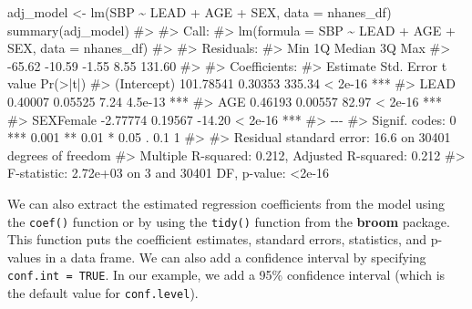 \documentclass[
  letterpaper,
]{latex/krantz}
\makeatletter
\newenvironment{Shaded}{\begin{snugshade}}{\end{snugshade}}
\newcommand{\AttributeTok}[1]{\textcolor[rgb]{0.40,0.45,0.13}{#1}}
\newcommand{\CommentTok}[1]{\textcolor[rgb]{0.37,0.37,0.37}{#1}}
\newcommand{\FunctionTok}[1]{\textcolor[rgb]{0.28,0.35,0.67}{#1}}
\newcommand{\NormalTok}[1]{\textcolor[rgb]{0.00,0.23,0.31}{#1}}
\newcommand{\OtherTok}[1]{\textcolor[rgb]{0.00,0.23,0.31}{#1}}
\newcommand{\SpecialCharTok}[1]{\textcolor[rgb]{0.37,0.37,0.37}{#1}}
\newenvironment{kframe}{%
\medskip{}
\setlength{\fboxsep}{.8em}
 \def\at@end@of@kframe{}%
 \ifinner\ifhmode%
  \def\at@end@of@kframe{\end{minipage}}%
  \begin{minipage}{\columnwidth}%
 \fi\fi%
 \def\FrameCommand##1{\hskip\@totalleftmargin \hskip-\fboxsep
 \colorbox{shadecolor}{##1}\hskip-\fboxsep
     \hskip-\linewidth \hskip-\@totalleftmargin \hskip\columnwidth}%
 \MakeFramed {\advance\hsize-\width
   \@totalleftmargin\z@ \linewidth\hsize
   \@setminipage}}%
 {\par\unskip\endMakeFramed%
 \at@end@of@kframe}
\renewenvironment{Shaded}{\begin{kframe}}{\end{kframe}}
\makeatother
\begin{document}
\begin{Shaded}
\begin{Highlighting}[]
\NormalTok{adj\_model }\OtherTok{\textless{}{-}} \FunctionTok{lm}\NormalTok{(SBP }\SpecialCharTok{\textasciitilde{}}\NormalTok{ LEAD }\SpecialCharTok{+}\NormalTok{ AGE }\SpecialCharTok{+}\NormalTok{ SEX, }\AttributeTok{data =}\NormalTok{ nhanes\_df)}
\FunctionTok{summary}\NormalTok{(adj\_model)}
\CommentTok{\#\textgreater{} }
\CommentTok{\#\textgreater{} Call:}
\CommentTok{\#\textgreater{} lm(formula = SBP \textasciitilde{} LEAD + AGE + SEX, data = nhanes\_df)}
\CommentTok{\#\textgreater{} }
\CommentTok{\#\textgreater{} Residuals:}
\CommentTok{\#\textgreater{}    Min     1Q Median     3Q    Max }
\CommentTok{\#\textgreater{} {-}65.62 {-}10.59  {-}1.55   8.55 131.60 }
\CommentTok{\#\textgreater{} }
\CommentTok{\#\textgreater{} Coefficients:}
\CommentTok{\#\textgreater{}              Estimate Std. Error t value Pr(\textgreater{}|t|)    }
\CommentTok{\#\textgreater{} (Intercept) 101.78541    0.30353  335.34  \textless{} 2e{-}16 ***}
\CommentTok{\#\textgreater{} LEAD          0.40007    0.05525    7.24  4.5e{-}13 ***}
\CommentTok{\#\textgreater{} AGE           0.46193    0.00557   82.97  \textless{} 2e{-}16 ***}
\CommentTok{\#\textgreater{} SEXFemale    {-}2.77774    0.19567  {-}14.20  \textless{} 2e{-}16 ***}
\CommentTok{\#\textgreater{} {-}{-}{-}}
\CommentTok{\#\textgreater{} Signif. codes:  0 \textquotesingle{}***\textquotesingle{} 0.001 \textquotesingle{}**\textquotesingle{} 0.01 \textquotesingle{}*\textquotesingle{} 0.05 \textquotesingle{}.\textquotesingle{} 0.1 \textquotesingle{} \textquotesingle{} 1}
\CommentTok{\#\textgreater{} }
\CommentTok{\#\textgreater{} Residual standard error: 16.6 on 30401 degrees of freedom}
\CommentTok{\#\textgreater{} Multiple R{-}squared:  0.212,  Adjusted R{-}squared:  0.212 }
\CommentTok{\#\textgreater{} F{-}statistic: 2.72e+03 on 3 and 30401 DF,  p{-}value: \textless{}2e{-}16}
\end{Highlighting}
\end{Shaded}

We can also extract the estimated regression coefficients from the model
using the \texttt{coef()}
function or by using the
\texttt{tidy()} function from
the \textbf{broom} package. This function puts
the coefficient estimates, standard errors, statistics, and p-values in
a data frame. We can also add a confidence interval by specifying
\texttt{conf.int\ =\ TRUE}. In our example, we add a 95\% confidence
interval (which is the default value for \texttt{conf.level}).
\end{document}
